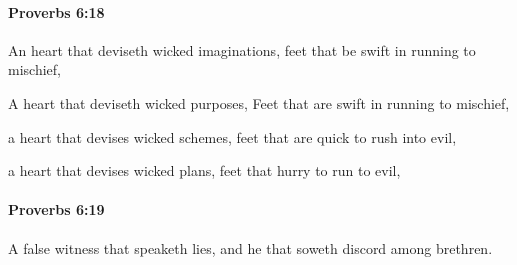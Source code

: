 		\paragraph{Proverbs 6:18} %
			\label{PROVERBS-6-18}

			An heart that deviseth wicked imaginations, feet that be swift in running to mischief,

			\begin{versebox}
					\item[BHS] 
					\item[ASV] A heart that deviseth wicked purposes, Feet that are swift in running to mischief,
					\item[NIV] a heart that devises wicked schemes, feet that are quick to rush into evil,
					\item[NRSV] a heart that devises wicked plans, feet that hurry to run to evil,
			\end{versebox}

		\paragraph{Proverbs 6:19} %
			\label{PROVERBS-6-19}

			A false witness that speaketh lies, and he that soweth discord among brethren.


